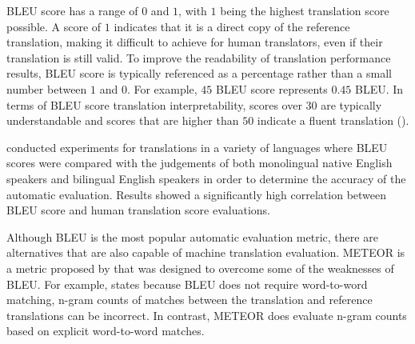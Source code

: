 \acrshort{BLEU} score has a range of $0$ and $1$, with $1$ being the highest translation score possible. A score of $1$ indicates that it is a direct copy of the reference translation, making it difficult to achieve for human translators, even if their translation is still valid. To improve the readability of translation performance results, \acrshort{BLEU} score is typically referenced as a percentage rather than a small number between $1$ and $0$. For example, $45$ \acrshort{BLEU} score represents $0.45$ \acrshort{BLEU}. In terms of \acrshort{BLEU} score translation interpretability, scores over $30$ are typically understandable and scores that are higher than $50$ indicate a fluent translation (\cite{lavie_evaluating_2010}).

\cite{papineni_bleu_2001} conducted experiments for translations in a variety of languages where \acrshort{BLEU} scores were compared with the judgements of both monolingual native English speakers and bilingual English speakers in order to determine the accuracy of the automatic evaluation. Results showed a significantly high correlation between \acrshort{BLEU} score and human translation score evaluations.





Although \acrshort{BLEU} is the most popular automatic evaluation metric, there are alternatives that are also capable of machine translation evaluation. \acrfull{METEOR} is a metric proposed by \cite{banerjee_meteor_2005} that was designed to overcome some of the weaknesses of \acrshort{BLEU}. For example, \cite{banerjee_meteor_2005} states because \acrshort{BLEU} does not require word-to-word matching, n-gram counts of matches between the translation and reference translations can be incorrect. In contrast, \acrshort{METEOR} does evaluate n-gram counts based on explicit word-to-word matches. 


